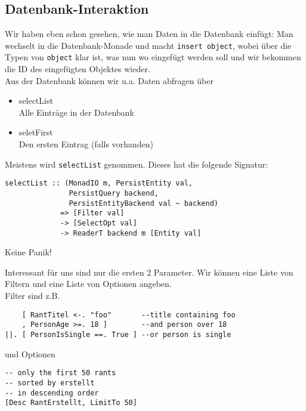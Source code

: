 \documentclass{beamer}
\begin{document}
\subsection{Datenbank-Interaktion}

\begin{frame}[fragile]
Wir haben eben schon gesehen, wie man Daten in die Datenbank einfügt: Man wechselt in die Datenbank-Monade und macht \texttt{insert object}, wobei über die Typen von \texttt{object} klar ist, was nun wo eingefügt werden soll und wir bekommen die ID des eingefügten Objektes wieder.\\\pause
Aus der Datenbank können wir u.a. Daten abfragen über
\pause
\begin{itemize}
 \item selectList\\
       Alle Einträge in der Datenbank
 \pause
 \item seletFirst\\
       Den ersten Eintrag (falls vorhanden)
\end{itemize}
\end{frame}

\begin{frame}[fragile]
Meistens wird \texttt{selectList} genommen. Dieses hat die folgende Signatur:
\begin{verbatim}
selectList :: (MonadIO m, PersistEntity val,
               PersistQuery backend,
               PersistEntityBackend val ~ backend)
             => [Filter val] 
             -> [SelectOpt val] 
             -> ReaderT backend m [Entity val]
\end{verbatim}
\pause
Keine Panik!
\end{frame}

\begin{frame}[fragile]
Interessant für uns sind nur die ersten 2 Parameter. Wir können eine Liste von Filtern und eine Liste von Optionen angeben.\\\pause
Filter sind z.B.
\begin{verbatim}
    [ RantTitel <-. "foo"       --title containing foo
    , PersonAge >=. 18 ]        --and person over 18
||. [ PersonIsSingle ==. True ] --or person is single
\end{verbatim}
\pause
und Optionen
\begin{verbatim}
-- only the first 50 rants 
-- sorted by erstellt
-- in descending order
[Desc RantErstellt, LimitTo 50]
\end{verbatim}
\end{frame}
\end{document}
